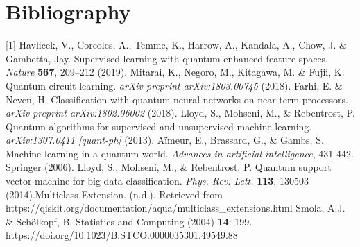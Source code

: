 \documentclass[twocolumn, english]{revtex4-2}
\numberwithin{equation}{section}
\begin{document}
\newpage
\section{Bibliography}
[1] Havlicek, V., Corcoles, A., Temme, K., Harrow, A., Kandala, A., Chow, J. \& Gambetta, Jay. Supervised learning with quantum enhanced feature spaces. \textit{Nature} \textbf{567}, 209–212 (2019). \newline
[2] Mitarai, K., Negoro, M., Kitagawa, M. \& Fujii, K. Quantum circuit learning. \textit{arXiv preprint arXiv:1803.00745} (2018). \newline
[3] Farhi, E. \& Neven, H. Classification with quantum neural networks on near term processors. \textit{arXiv preprint arXiv:1802.06002} (2018). \newline
[4] Lloyd, S., Mohseni, M., \& Rebentrost, P. Quantum algorithms for supervised and unsupervised machine learning. \textit{	arXiv:1307.0411 [quant-ph]} (2013). \newline
[5] Aïmeur, E., Brassard, G., \& Gambs, S. Machine learning in a quantum world. \textit{Advances in artificial intelligence}, 431-442. Springer (2006). \newline
[6] Lloyd, S., Mohseni, M., \& Rebentrost, P. Quantum support vector machine for big data classification. \textit{Phys. Rev. Lett.} \textbf{113}, 130503 (2014).\newline
[7] Multiclass Extension. (n.d.). \newline Retrieved from https://qiskit.org/documentation/aqua/\newline multiclass\_extensions.html \newline
[8] Smola, A.J. \& Schölkopf, B. Statistics and Computing (2004) \textbf{14}: 199. https://doi.org/10.1023\newline/B:STCO.0000035301.49549.88
\end{document}
